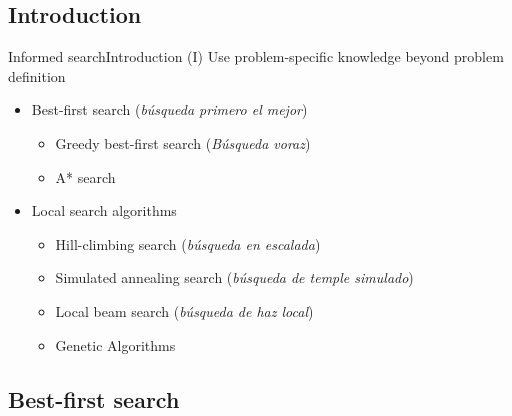 \documentclass[10pt,compress]{beamer} %
\begin{document}
\subsection{Introduction}

\begin{frame}{Informed search}{Introduction (I)}
    Use problem-specific knowledge beyond problem definition
      \begin{itemize}
        \item Best-first search (\textit{búsqueda primero el mejor})
            \begin{itemize}
                \item Greedy best-first search (\textit{Búsqueda voraz})
                \item A* search
            \end{itemize}
        \item Local search algorithms
            \begin{itemize}
            \item Hill-climbing search (\textit{búsqueda en escalada})
            \item Simulated annealing search (\textit{búsqueda de temple simulado})
            \item Local beam search (\textit{búsqueda de haz local})
            \item Genetic Algorithms 
        \end{itemize}
      \end{itemize}
\end{frame}

\subsection{Best-first search}
\end{document}
